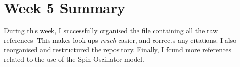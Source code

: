 \documentclass{article}
\begin{document}
\section*{Week 5 Summary}

\vspace{0.5cm}

During this week, I successfully organised the file containing all the raw references. This makes look-ups \textit{much} easier, and corrects any citations. I also reorganised and restructured the repository. Finally, I found more references related to the use of the Spin-Oscillator model.
\end{document}
